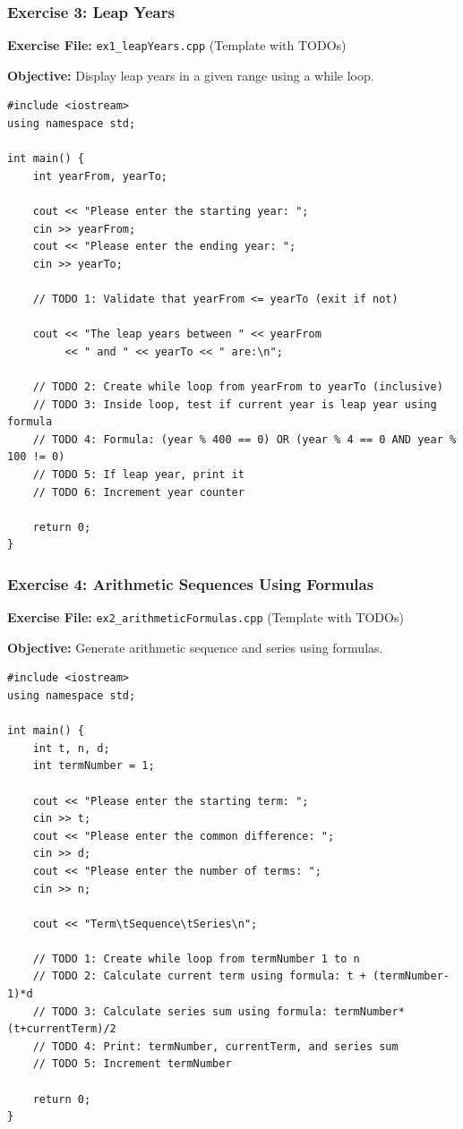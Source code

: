 \documentclass{beamer}
\begin{document}
\begin{frame}[fragile]
\frametitle{Exercise 3: Leap Years}
\textbf{Exercise File:} \texttt{ex1\_leapYears.cpp} (Template with TODOs)

\pause
\textbf{Objective:} Display leap years in a given range using a while loop.

\begin{verbatim}
#include <iostream>
using namespace std;

int main() {
    int yearFrom, yearTo;
    
    cout << "Please enter the starting year: ";
    cin >> yearFrom;
    cout << "Please enter the ending year: ";
    cin >> yearTo;
    
    // TODO 1: Validate that yearFrom <= yearTo (exit if not)
    
    cout << "The leap years between " << yearFrom 
         << " and " << yearTo << " are:\n";
    
    // TODO 2: Create while loop from yearFrom to yearTo (inclusive)
    // TODO 3: Inside loop, test if current year is leap year using formula
    // TODO 4: Formula: (year % 400 == 0) OR (year % 4 == 0 AND year % 100 != 0)
    // TODO 5: If leap year, print it
    // TODO 6: Increment year counter
    
    return 0;
}
\end{verbatim}
\end{frame}

\begin{frame}[fragile]
\frametitle{Exercise 4: Arithmetic Sequences Using Formulas}
\textbf{Exercise File:} \texttt{ex2\_arithmeticFormulas.cpp} (Template with TODOs)

\pause
\textbf{Objective:} Generate arithmetic sequence and series using formulas.

\begin{verbatim}
#include <iostream>
using namespace std;

int main() {
    int t, n, d;
    int termNumber = 1;
    
    cout << "Please enter the starting term: ";
    cin >> t;
    cout << "Please enter the common difference: ";
    cin >> d;
    cout << "Please enter the number of terms: ";
    cin >> n;
    
    cout << "Term\tSequence\tSeries\n";
    
    // TODO 1: Create while loop from termNumber 1 to n
    // TODO 2: Calculate current term using formula: t + (termNumber-1)*d
    // TODO 3: Calculate series sum using formula: termNumber*(t+currentTerm)/2
    // TODO 4: Print: termNumber, currentTerm, and series sum
    // TODO 5: Increment termNumber
    
    return 0;
}
\end{verbatim}
\end{frame}
\end{document}
